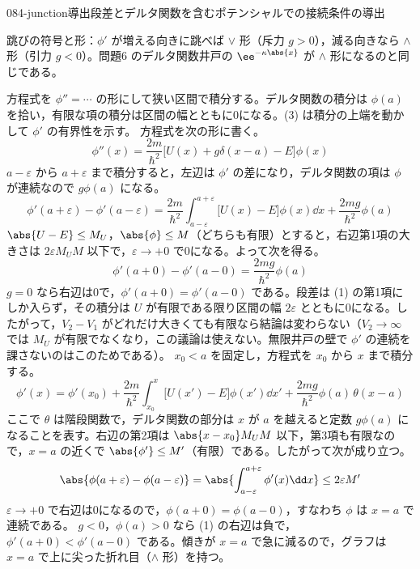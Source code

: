 \documentclass[uplatex,dvipdfmx,a4paper,11pt]{jsarticle}
\begin{document}
\begin{mondai}{084-junction}{導出}{段差とデルタ関数を含むポテンシャルでの接続条件の導出}
\begin{kizuki}
\item 跳びの符号と形：$\phi'$ が増える向きに跳べば $\vee$ 形（斥力 $g>0$），減る向きなら $\wedge$ 形（引力 $g<0$）。問題6 のデルタ関数井戸の $\ee^{-\kappa\abs{x}}$ が $\wedge$ 形になるのと同じである。
\end{kizuki}
\begin{tadashii}
\houshin 方程式を $\phi''=\cdots$ の形にして狭い区間で積分する。デルタ関数の積分は $\phi(a)$ を拾い，有限な項の積分は区間の幅とともに0になる。(3) は積分の上端を動かして $\phi'$ の有界性を示す。
\keisan
{} 方程式を次の形に書く。
\[ \phi''(x)=\frac{2m}{\hbar^{2}}\bigl[U(x)+g\delta(x-a)-E\bigr]\phi(x) \]
$a-\varepsilon$ から $a+\varepsilon$ まで積分すると，左辺は $\phi'$ の差になり，デルタ関数の項は $\phi$ が連続なので $g\phi(a)$ になる。
\[ \phi'(a+\varepsilon)-\phi'(a-\varepsilon)=\frac{2m}{\hbar^{2}}\int_{a-\varepsilon}^{a+\varepsilon}\bigl[U(x)-E\bigr]\phi(x)\dd x+\frac{2mg}{\hbar^{2}}\phi(a) \]
$\abs{U-E}\le M_{U}$，$\abs{\phi}\le M$（どちらも有限）とすると，右辺第1項の大きさは $2\varepsilon M_{U}M$ 以下で，$\varepsilon\to+0$ で0になる。よって次を得る。
\[ \phi'(a+0)-\phi'(a-0)=\frac{2mg}{\hbar^{2}}\phi(a) \]
 $g=0$ なら右辺は0で，$\phi'(a+0)=\phi'(a-0)$ である。段差は (1) の第1項にしか入らず，その積分は $U$ が有限である限り区間の幅 $2\varepsilon$ とともに0になる。したがって，$V_{2}-V_{1}$ がどれだけ大きくても有限なら結論は変わらない（$V_{2}\to\infty$ では $M_{U}$ が有限でなくなり，この議論は使えない。無限井戸の壁で $\phi'$ の連続を課さないのはこのためである）。
 $x_{0}<a$ を固定し，方程式を $x_{0}$ から $x$ まで積分する。
\[ \phi'(x)=\phi'(x_{0})+\frac{2m}{\hbar^{2}}\int_{x_{0}}^{x}\bigl[U(x')-E\bigr]\phi(x')\dd x'+\frac{2mg}{\hbar^{2}}\phi(a)\,\theta(x-a) \]
ここで $\theta$ は階段関数で，デルタ関数の部分は $x$ が $a$ を越えると定数 $g\phi(a)$ になることを表す。右辺の第2項は $\abs{x-x_{0}}M_{U}M$ 以下，第3項も有限なので，$x=a$ の近くで $\abs{\phi'}\le M'$（有限）である。したがって次が成り立つ。
\[ \abs{\phi(a+\varepsilon)-\phi(a-\varepsilon)}=\abs{\int_{a-\varepsilon}^{a+\varepsilon}\phi'(x)\dd x}\le 2\varepsilon M' \]
$\varepsilon\to+0$ で右辺は0になるので，$\phi(a+0)=\phi(a-0)$，すなわち $\phi$ は $x=a$ で連続である。
 $g<0$，$\phi(a)>0$ なら (1) の右辺は負で，$\phi'(a+0)<\phi'(a-0)$ である。傾きが $x=a$ で急に減るので，グラフは $x=a$ で上に尖った折れ目（$\wedge$ 形）を持つ。

\end{tadashii}
\end{mondai}
\end{document}
